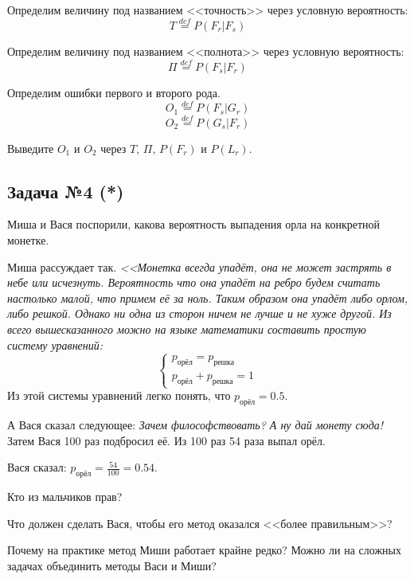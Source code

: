 \documentclass[english,russian,12pt]{article}
\begin{document}
Определим величину под названием <<точность>> через условную вероятность:
\begin{equation}
T \stackrel{def}{=} P(F_r | F_s)
\end{equation}

Определим величину под названием <<полнота>> через условную вероятность:
\begin{equation}
\Pi \stackrel{def}{=} P(F_s | F_r)
\end{equation}

Определим ошибки первого и второго рода.
\begin{equation}
O_1 \stackrel{def}{=} P(F_s | G_r)
\end{equation}
\begin{equation}
O_2 \stackrel{def}{=} P(G_s | F_r)
\end{equation}

Выведите $O_1$ и $O_2$ через $T$, $\Pi$, $P(F_r)$ и $P(L_r)$.

\newpage
\subsection*{Задача №4 (*)}
Миша и Вася поспорили, какова вероятность выпадения орла на конкретной монетке. 

Миша рассуждает так. \textit{<<Монетка всегда упадёт, она не может застрять в небе или исчезнуть. Вероятность что она упадёт на ребро будем считать настолько малой, что примем её за ноль. Таким образом она упадёт либо орлом, либо решкой. Однако ни одна из сторон ничем не лучше и не хуже другой. Из всего вышесказанного можно на языке математики составить простую систему уравнений:}
\begin{equation}
\left\{
\begin{array}{l}
p_{\text{орёл}} = p_{\text{решка}} \\
p_{\text{орёл}} + p_{\text{решка}} = 1
\end{array}
\right.
\end{equation}
Из этой системы уравнений легко понять, что $p_{\text{орёл}}=0.5$.

А Вася сказал следующее: \textit{Зачем философствовать? А ну дай монету сюда!} Затем Вася 100 раз подбросил её. Из 100 раз 54 раза выпал орёл. 

Вася сказал:  $p_{\text{орёл}}=\frac{54}{100}=0.54$.

Кто из мальчиков прав? 

Что должен сделать Вася, чтобы его метод оказался <<более правильным>>? 

Почему на практике метод Миши работает крайне редко? Можно ли на сложных задачах объединить методы Васи и Миши?
\end{document}
